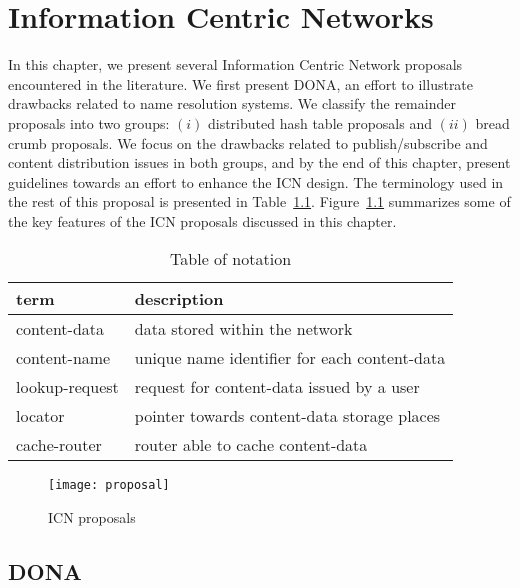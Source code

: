 \chapter{Information Centric Networks}
\label{chapt:icn}
 
In this chapter, we present several Information Centric Network proposals encountered in the literature.
We first present DONA, an effort to illustrate drawbacks related to name resolution systems.
We classify the remainder proposals into two groups: $(i)$ distributed hash table proposals and $(ii)$
bread crumb proposals. We focus on the drawbacks related to publish/subscribe and content distribution issues
in both groups, and by the end of this chapter, present guidelines towards an effort to enhance the ICN design. 
The terminology used in the rest of this proposal is presented in Table~\ref{terminology}.  
Figure~\ref{tabproposals} summarizes some of the key features of the ICN proposals discussed in this chapter.


\vspace{0.1in}

\begin{table}[h!]
\center
\begin{tabular}{l|l}
\hline
\textbf{term} & \textbf{description} \\
\hline
\hline
content-data & data stored within the network \\
content-name &  unique name identifier for each content-data \\ 
lookup-request & request for content-data issued by a user \\
locator &  pointer towards content-data storage places \\
cache-router & router able to cache content-data \\
\hline
\end{tabular}
\caption{Table of notation}
\label{terminology}
\end{table}

 
\begin{figure}
\center
\texttt{[image: proposal]}
\label{tabproposals}
\caption{ICN proposals}
\end{figure}


\section{DONA}

